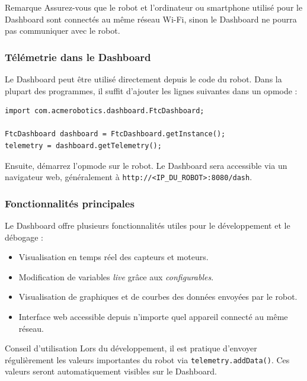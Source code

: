 \documentclass[12pt, a4paper]{report}
\begin{document}
    \begin{myinfo}{Remarque}
        Assurez-vous que le robot et l’ordinateur ou smartphone utilisé pour le Dashboard sont connectés au même réseau Wi-Fi, sinon le Dashboard ne pourra pas communiquer avec le robot.
    \end{myinfo}


    \subsubsection{Télémetrie dans le Dashboard}

    Le Dashboard peut être utilisé directement depuis le code du robot. Dans la plupart des programmes, il suffit d’ajouter les lignes suivantes dans un opmode :

    \begin{verbatim}
import com.acmerobotics.dashboard.FtcDashboard;

FtcDashboard dashboard = FtcDashboard.getInstance();
telemetry = dashboard.getTelemetry();
    \end{verbatim}

    Ensuite, démarrez l’opmode sur le robot. Le Dashboard sera accessible via un navigateur web, généralement à \verb|http://<IP_DU_ROBOT>:8080/dash|.


    \subsubsection{Fonctionnalités principales}

    Le Dashboard offre plusieurs fonctionnalités utiles pour le développement et le débogage :

    \begin{itemize}
        \item Visualisation en temps réel des capteurs et moteurs.
        \item Modification de variables \textit{live} grâce aux \textit{configurables}.
        \item Visualisation de graphiques et de courbes des données envoyées par le robot.
        \item Interface web accessible depuis n’importe quel appareil connecté au même réseau.
    \end{itemize}

    \begin{myinfo}{Conseil d'utilisation}
        Lors du développement, il est pratique d’envoyer régulièrement les valeurs importantes du robot via \verb|telemetry.addData()|. Ces valeurs seront automatiquement visibles sur le Dashboard.
    \end{myinfo}
\end{document}
